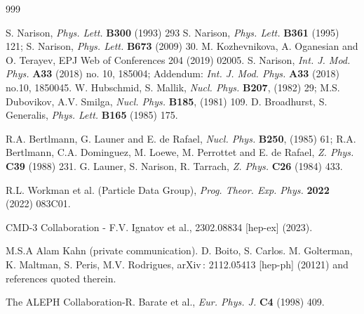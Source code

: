 \begin{thebibliography}{999}

S. Narison, {\it Phys. Lett.}  {\bf B300} (1993) 293
S. Narison, {\it Phys. Lett.}  {\bf B361} (1995) 121;
S. Narison, {\it Phys. Lett.} {\bf B673} (2009) 30.
 M. Kozhevnikova, A. Oganesian and O. Terayev, EPJ Web of Conferences 204 (2019) 02005.
  S. Narison,  {\it Int. J. Mod. Phys.} {\bf A33} (2018) no. 10, 185004; %
  Addendum: {\it Int. J. Mod. Phys.} {\bf A33} (2018) no.10, 1850045.%
 W. Hubschmid, S. Mallik, {\it Nucl. Phys.} {\bf B207}, (1982) 29;
M.S. Dubovikov, A.V. Smilga, {\it Nucl. Phys.} {\bf B185}, (1981) 109.
 D. Broadhurst, S. Generalis, {\it  Phys. Lett.} 
{\bf B165} (1985)  175.

R.A. Bertlmann, G. Launer and E. de Rafael, {\it Nucl. Phys.} {\bf B250}, (1985) 61;  R.A. Bertlmann, C.A. Dominguez, M. Loewe, M. Perrottet and E. de Rafael, {\it Z. Phys.} {\bf C39} (1988) 231.
G. Launer, S. Narison, R. Tarrach, {\it  Z. Phys.} {\bf C26}
(1984) 433.

R.L. Workman et al. (Particle Data Group), {\it Prog. Theor. Exp. Phys.}  {\bf 2022} (2022) 083C01.

CMD-3 Collaboration - F.V. Ignatov et al., 2302.08834 [hep-ex] (2023).

 M.S.A Alam Kahn (private communication).
  D. Boito, S. Carlos. M. Golterman, K. Maltman, S. Peris, M.V. Rodrigues, arXiv\,: 2112.05413 [hep-ph] (20121) and references quoted therein.

 The ALEPH Collaboration-R. Barate et al., {\it Eur. Phys. J.} {\bf C4} (1998) 409.


\end{thebibliography}
